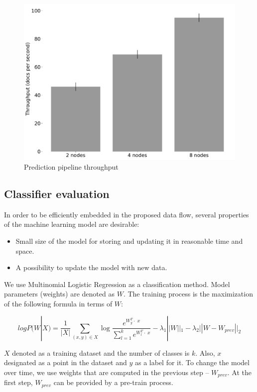 \begin{figure}[htbp]
  \centering
  \includegraphics[scale=0.21]{pics/classifier_throughput}
  \caption{Prediction pipeline throughput}
  \label {throughput}
\end{figure}

\subsection{Classifier evaluation}

In order to be efficiently embedded in the proposed data flow, several properties of the machine learning model are desirable:
\begin{itemize}
     \item Small size of the model for storing and updating it in reasonable time and space.
     \item A possibility to update the model with new data.
\end{itemize}

We use Multinomial Logistic Regression as a classification method. Model parameters (weights) are denoted as $W$. The training process is the maximization of the following formula in terms of $W$:

$$ logP(W | X) = \frac{1}{|X|} \sum \limits_{(x, y) \in X} \log \frac{e^{{W_y^T \cdot \; x}}}{\sum \limits_{l = 1}^{k}  e^{{W_{l}^T \cdot \; x}}} - \lambda_1 ||W||_1 - \lambda_2 ||W - W_{prev}||_2 $$ 

$X$ denoted as a training dataset and the number of classes is $k$. Also, $x$ designated as a point in the dataset and $y$ as a label for it. To change the model over time, we use weights that are computed in the previous step -- $W_{prev}$. At the first step, $W_{prev}$ can be provided by a pre-train process.

